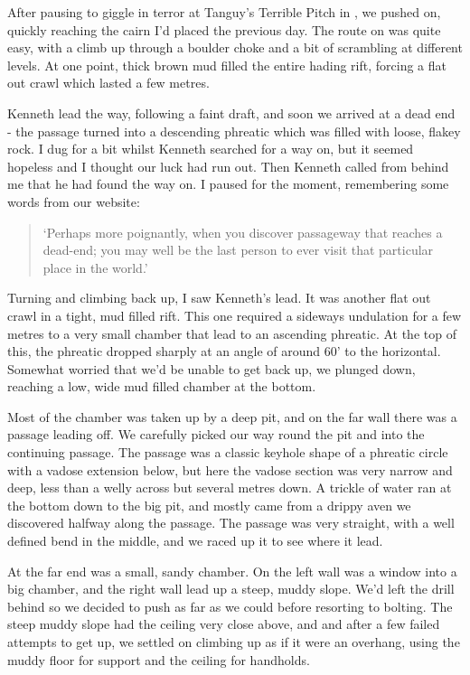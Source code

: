 After pausing to giggle in terror at Tanguy's Terrible Pitch in , we pushed on, quickly reaching the cairn I'd placed the previous day. The route on was quite easy, with a climb up through a boulder choke and a bit of scrambling at different levels. At one point, thick brown mud filled the entire hading rift, forcing a flat out crawl which lasted a few metres.
 
Kenneth lead the way, following a faint draft, and soon we arrived at a dead end - the passage turned into a descending phreatic which was filled with loose, flakey rock. I dug for a bit whilst Kenneth searched for a way on, but it seemed hopeless and I thought our luck had run out. Then Kenneth called from behind me that he had found the way on. I paused for the moment, remembering some words from our website: 

\begin{quote} `Perhaps more poignantly, when you discover passageway that reaches a dead-end; you may well be the last person to ever visit that particular place in the world.' \end{quote}
 
Turning and climbing back up, I saw Kenneth's lead. It was another flat out crawl in a tight, mud filled rift. This one required a sideways undulation for a few metres to a very small chamber that lead to an ascending phreatic. At the top of this, the phreatic dropped sharply at an angle of around 60' to the horizontal. Somewhat worried that we'd be unable to get back up, we plunged down, reaching a low, wide mud filled chamber at the bottom.
 
Most of the chamber was taken up by a deep pit, and on the far wall there was a passage leading off. We carefully picked our way round the pit and into the continuing passage. The passage was a classic keyhole shape of a phreatic circle with a vadose extension below, but here the vadose section was very narrow and deep, less than a welly across but several metres down. A trickle of water ran at the bottom down to the big pit, and mostly came from a drippy aven we discovered halfway along the passage. The passage was very straight, with a well defined bend in the middle, and we raced up it to see where it lead.
 
At the far end was a small, sandy chamber. On the left wall was a window into a big chamber, and the right wall lead up a steep, muddy slope. We'd left the drill behind so we decided to push as far as we could before resorting to bolting. The steep muddy slope had the ceiling very close above, and and after a few failed attempts to get up, we settled on climbing up as if it were an overhang, using the muddy floor for support and the ceiling for handholds.
 
